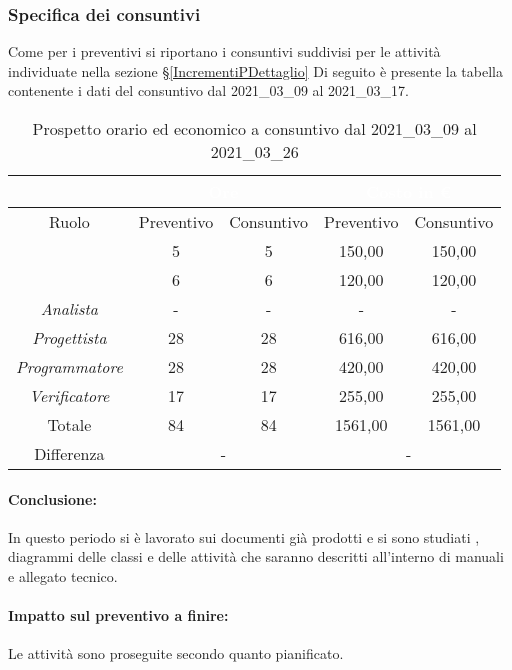 \subsubsection{Specifica dei consuntivi}
Come per i preventivi si riportano i consuntivi suddivisi per le attività individuate nella sezione \S\ref{IncrementiPDettaglio}
Di seguito è presente la tabella contenente i dati del consuntivo dal 2021\_03\_09 al 2021\_03\_17.
\begin{table}[H]
	\centering
	\begin{tabular}{|c|c|c|c|c|}
		\rowcolor{darkblue} 
		&\multicolumn{2}{c|}{\textcolor{white}{Ore}}&\multicolumn{2}{c|}{\textcolor{white}{Costo in €}}\\ \hline
		Ruolo			&	Preventivo				&	Consuntivo		&	Preventivo	&	Consuntivo\\ \hline
		{\Responsabile}		&	5					&	5			&	150,00		&	150,00 \\ \hline
		{\Amministratore}	&	6					&	6				&	120,00		&	120,00 \\ \hline
		\textit{Analista}	&	-					&	-			&	-		&	- \\ \hline
		\textit{Progettista}& 	28					&   28 				& 	616,00		&  	616,00 \\ \hline
		\textit{Programmatore}& 28					& 	28				& 	420,00		&  	420,00 \\ \hline
		\textit{Verificatore}&	17					&	17			&	255,00		&	255,00\\ \hline
		Totale				&	84					&	84				&	1561,00		&	1561,00 \\ \hline
		Differenza			& 	\multicolumn{2}{c|}{-} 			    &\multicolumn{2}{c|}{-}\\ \hline
	\end{tabular}
	\caption{Prospetto orario ed economico a consuntivo dal 2021\_03\_09 al 2021\_03\_26}
\end{table}
\paragraph*{Conclusione:}
In questo periodo si è lavorato sui documenti già prodotti e si sono studiati , diagrammi delle classi e delle attività che saranno descritti all'interno di manuali e allegato tecnico.
\paragraph*{Impatto sul preventivo a finire:}
Le attività sono proseguite secondo quanto pianificato.

